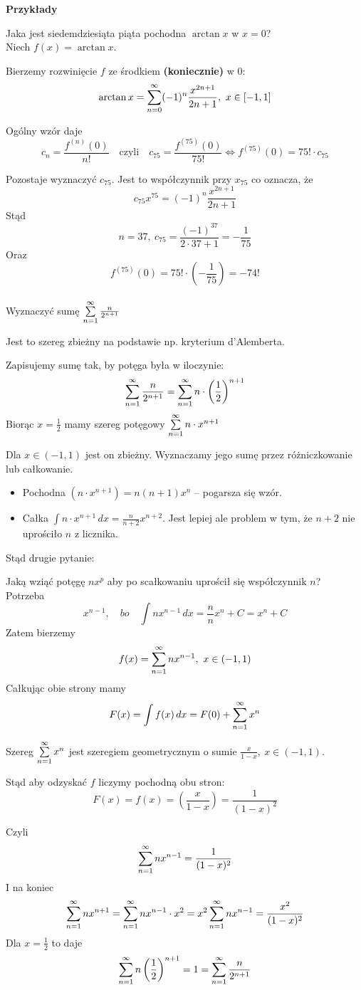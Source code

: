 \textbf{Przykłady}

Jaka jest siedemdziesiąta piąta pochodna $\arctan x$ w $x = 0$? \\

Niech $f(x) = \arctan x $. 

Bierzemy rozwinięcie $f$ ze środkiem \textbf{(koniecznie)} w $0$:
$$ \arctan x = \sum\limits_{n = 0}^{\infty} (-1)^n \frac{x^{2n+1}}{2n+1}, \ x\in [-1, 1] $$

Ogólny wzór daje
$$ c_n = \frac{f^{(n)}(0)}{n!} \quad \textrm{czyli} \quad c_{75} = \frac{f^{(75)}(0)}{75!} \Leftrightarrow f^{(75)}(0) = 75! \cdot c_{75} $$

Pozostaje wyznaczyć $c_{75}$. Jest to współczynnik przy $ x_{75} $ co oznacza, że
$$ c_{75} x^{75} = (-1)^n \frac{x^{2n+1}}{2n+1} $$
Stąd
$$ n = 37, \ c_{75} = \frac{(-1)^{37}}{2 \cdot 37 + 1} = - \frac{1}{75} $$
Oraz
$$ f^{(75)}(0) = 75! \cdot \left( - \frac{1}{75} \right) = -74! $$ \\

Wyznaczyć sumę $ \sum\limits_{n = 1}^{\infty} \frac{n}{2^{n + 1}} $

Jest to szereg zbieżny na podstawie np. kryterium d'Alemberta.

Zapisujemy sumę tak, by potęga była w iloczynie:
$$ \sum\limits_{n = 1}^{\infty} \frac{n}{2^{n+1}} = \sum\limits_{n = 1}^{\infty} n \cdot \left( \frac{1}{2} \right)^{n+1} $$
Biorąc $ x = \frac{1}{2} $ mamy szereg potęgowy $ \sum\limits_{n = 1}^{\infty} n \cdot x^{n+1} $

Dla $ x\in (-1, 1) $ jest on zbieżny. Wyznaczamy jego sumę przez różniczkowanie lub całkowanie.

\begin{itemize}
    \item Pochodna $ (n \cdot x^{n+1}) = n(n+1)x^n $ -- pogarsza się wzór.
    \item Całka $ \int n \cdot x^{n+1} \,dx = \frac{n}{n+2}x^{n+2} $. Jest lepiej ale problem w tym, że $n+2$ nie uprościło $n$ z licznika.
\end{itemize}

Stąd drugie pytanie:

Jaką wziąć potęgę $nx^p$ aby po scałkowaniu uprościł się współczynnik $n$? \\

Potrzeba
$$ x^{n-1}, \quad bo \quad \int nx^{n-1} \,dx = \frac{n}{n} x^n + C = x^n + C $$
Zatem bierzemy
$$ f(x) = \sum\limits_{n = 1}^{\infty} nx^{n-1}, \ x\in (-1, 1) $$
Całkując obie strony mamy
$$ F(x) = \int f(x) \,dx = F(0) + \sum\limits_{n = 1}^{\infty} x^n $$

Szereg $ \sum\limits_{n = 1}^{\infty} x^n $ jest szeregiem geometrycznym o sumie $ \frac{x}{1-x}, \ x\in (-1, 1) $.

Stąd aby odzyskać $f$ liczymy pochodną obu stron:
$$ F(x) = f(x) = \left( \frac{x}{1-x} \right) = \frac{1}{(1-x)^2} $$

Czyli
$$ \sum\limits_{n = 1}^{\infty} nx^{n-1} = \frac{1}{(1-x)^2} $$
I na koniec
$$ \sum\limits_{n = 1}^{\infty} nx^{n+1} = \sum\limits_{n = 1}^{\infty} nx^{n-1} \cdot x^2 = x^2 \sum\limits_{n = 1}^{\infty} nx^{n-1} = \frac{x^2}{(1-x)^2} $$
Dla $ x = \frac{1}{2} $ to daje
$$ \sum\limits_{n = 1}^{\infty} n \left( \frac{1}{2} \right)^{n+1} = 1 = \sum\limits_{n = 1}^{\infty} \frac{n}{2^{n+1}} $$
